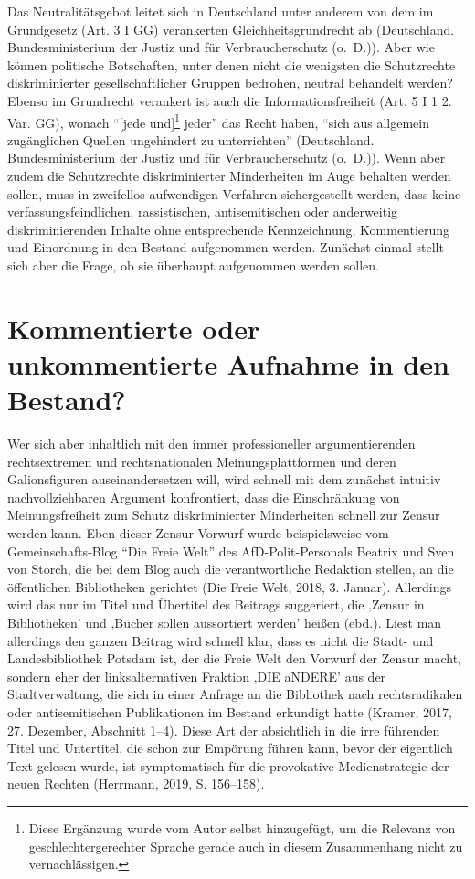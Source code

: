 \documentclass[a4paper,
fontsize=11pt,
oneside,
numbers=noperiodatend,
parskip=half-,
bibliography=totoc,
final
]{scrartcl}
\begin{document}
Das Neutralitätsgebot leitet sich in Deutschland unter anderem von dem
im Grundgesetz (Art. 3 I GG) verankerten Gleichheitsgrundrecht ab
(Deutschland. Bundesministerium der Justiz und für Verbraucherschutz
(o.~D.)). Aber wie können politische Botschaften, unter denen nicht die
wenigsten die Schutzrechte diskriminierter gesellschaftlicher Gruppen
bedrohen, neutral behandelt werden? Ebenso im Grundrecht verankert ist
auch die Informationsfreiheit (Art. 5 I 1 2. Var. GG), wonach
\enquote{{[}jede und{]}\footnote{Diese Ergänzung wurde vom Autor selbst
  hinzugefügt, um die Relevanz von geschlechtergerechter Sprache gerade
  auch in diesem Zusammenhang nicht zu vernachlässigen.} jeder} das
Recht haben, \enquote{sich aus allgemein zugänglichen Quellen
ungehindert zu unterrichten} (Deutschland. Bundesministerium der Justiz
und für Verbraucherschutz (o.~D.)). Wenn aber zudem die Schutzrechte
diskriminierter Minderheiten im Auge behalten werden sollen, muss in
zweifellos aufwendigen Verfahren sichergestellt werden, dass keine
verfassungsfeindlichen, rassistischen, antisemitischen oder anderweitig
diskriminierenden Inhalte ohne entsprechende Kennzeichnung,
Kommentierung und Einordnung in den Bestand aufgenommen werden. Zunächst
einmal stellt sich aber die Frage, ob sie überhaupt aufgenommen werden
sollen.

\hypertarget{kommentierte-oder-unkommentierte-aufnahme-in-den-bestand}{%
\section*{Kommentierte oder unkommentierte Aufnahme in den
Bestand?}\label{kommentierte-oder-unkommentierte-aufnahme-in-den-bestand}}

Wer sich aber inhaltlich mit den immer professioneller argumentierenden
rechtsextremen und rechtsnationalen Meinungsplattformen und deren
Galionsfiguren auseinandersetzen will, wird schnell mit dem zunächst
intuitiv nachvollziehbaren Argument konfrontiert, dass die Einschränkung
von Meinungsfreiheit zum Schutz diskriminierter Minderheiten schnell zur
Zensur werden kann. Eben dieser Zensur-Vorwurf wurde beispielsweise vom
Gemeinschafts-Blog \enquote{Die Freie Welt} des AfD-Polit-Personals
Beatrix und Sven von Storch, die bei dem Blog auch die verantwortliche
Redaktion stellen, an die öffentlichen Bibliotheken gerichtet (Die Freie
Welt, 2018, 3. Januar). Allerdings wird das nur im Titel und Übertitel
des Beitrags suggeriert, die ‚Zensur in Bibliotheken' und ‚Bücher sollen
aussortiert werden' heißen (ebd.). Liest man allerdings den ganzen
Beitrag wird schnell klar, dass es nicht die Stadt- und Landesbibliothek
Potsdam ist, der die Freie Welt den Vorwurf der Zensur macht, sondern
eher der linksalternativen Fraktion ‚DIE aNDERE' aus der
Stadtverwaltung, die sich in einer Anfrage an die Bibliothek nach
rechtsradikalen oder antisemitischen Publikationen im Bestand erkundigt
hatte (Kramer, 2017, 27. Dezember, Abschnitt 1--4). Diese Art der
absichtlich in die irre führenden Titel und Untertitel, die schon zur
Empörung führen kann, bevor der eigentlich Text gelesen wurde, ist
symptomatisch für die provokative Medienstrategie der neuen Rechten
(Herrmann, 2019, S. 156--158).
\end{document}
